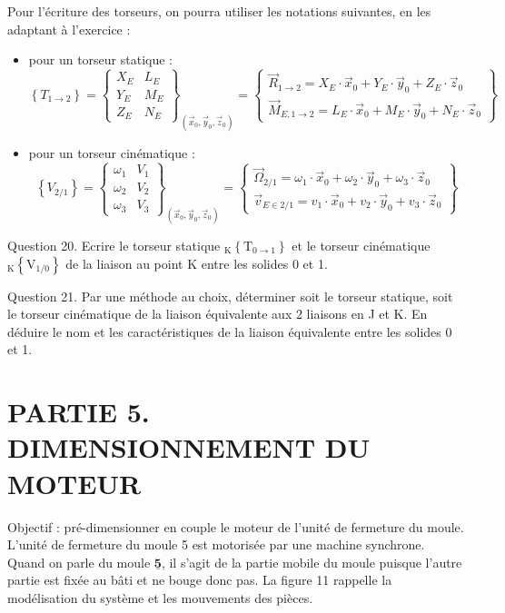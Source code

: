 \documentclass[10pt]{article}
\begin{document}
Pour l'écriture des torseurs, on pourra utiliser les notations suivantes, en les adaptant à l'exercice :

\begin{itemize}
  \item[-] pour un torseur statique :
$$
\left\{T_{1 \rightarrow 2}\right\}=\left\{\begin{array}{ll}
X_{E} & L_{E} \\
Y_{E} & M_{E} \\
Z_{E} & N_{E}
\end{array}\right\}_{\left(\vec{x}_{0}, \vec{y}_{0}, \vec{z}_{0}\right)}=\left\{\begin{array}{l}
\vec{R}_{1 \rightarrow 2}=X_{E} \cdot \vec{x}_{0}+Y_{E} \cdot \vec{y}_{0}+Z_{E} \cdot \vec{z}_{0} \\
\vec{M}_{E, 1 \rightarrow 2}=L_{E} \cdot \vec{x}_{0}+M_{E} \cdot \vec{y}_{0}+N_{E} \cdot \vec{z}_{0}
\end{array}\right\}
$$
  \item[-] pour un torseur cinématique :
$$
\left\{V_{2 / 1}\right\}=\left\{\begin{array}{ll}
\omega_{1} & V_{1} \\
\omega_{2} & V_{2} \\
\omega_{3} & V_{3}
\end{array}\right\}_{\left(\vec{x}_{0}, \vec{y}_{0}, \vec{z}_{0}\right)}=\left\{\begin{array}{l}
\vec{\Omega}_{2 / 1}=\omega_{1} \cdot \vec{x}_{0}+\omega_{2} \cdot \vec{y}_{0}+\omega_{3} \cdot \vec{z}_{0} \\
\vec{v}_{E \in 2 / 1}=v_{1} \cdot \vec{x}_{0}+v_{2} \cdot \vec{y}_{0}+v_{3} \cdot \vec{z}_{0}
\end{array}\right\}
$$
\end{itemize}

Question 20. Ecrire le torseur statique ${ }_{\mathrm{K}}\left\{\mathrm{T}_{0 \rightarrow 1}\right\}$ et le torseur cinématique ${ }_{\mathrm{K}}\left\{\mathrm{V}_{1 / 0}\right\}$ de la liaison au point K entre les solides 0 et 1.

Question 21. Par une méthode au choix, déterminer soit le torseur statique, soit le torseur cinématique de la liaison équivalente aux 2 liaisons en J et K. En déduire le nom et les caractéristiques de la liaison équivalente entre les solides 0 et 1.

\section*{PARTIE 5. DIMENSIONNEMENT DU MOTEUR}
Objectif : pré-dimensionner en couple le moteur de l'unité de fermeture du moule.\\
L'unité de fermeture du moule 5 est motorisée par une machine synchrone.\\
Quand on parle du moule $\underline{\mathbf{5}}$, il s'agit de la partie mobile du moule puisque l'autre partie est fixée au bâti et ne bouge donc pas. La figure 11 rappelle la modélisation du système et les mouvements des pièces.
\end{document}
